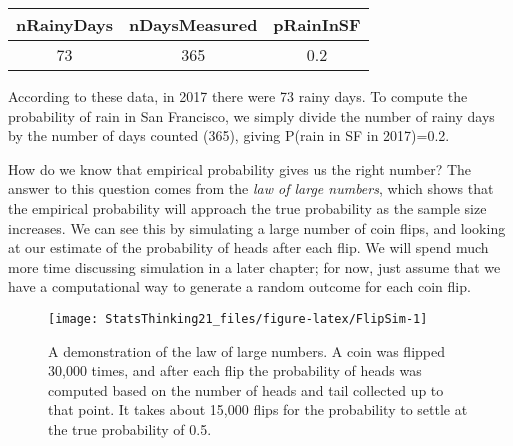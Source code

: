 \documentclass[]{book}
\theoremstyle{definition}
\theoremstyle{definition}
\theoremstyle{definition}
\theoremstyle{remark}
\begin{document}
\begin{longtable}[]{@{}ccc@{}}
\toprule
\begin{minipage}[b]{0.16\columnwidth}\centering\strut
nRainyDays\strut
\end{minipage} & \begin{minipage}[b]{0.20\columnwidth}\centering\strut
nDaysMeasured\strut
\end{minipage} & \begin{minipage}[b]{0.14\columnwidth}\centering\strut
pRainInSF\strut
\end{minipage}\tabularnewline
\midrule
\endhead
\begin{minipage}[t]{0.16\columnwidth}\centering\strut
73\strut
\end{minipage} & \begin{minipage}[t]{0.20\columnwidth}\centering\strut
365\strut
\end{minipage} & \begin{minipage}[t]{0.14\columnwidth}\centering\strut
0.2\strut
\end{minipage}\tabularnewline
\bottomrule
\end{longtable}

According to these data, in 2017 there were 73 rainy days. To compute
the probability of rain in San Francisco, we simply divide the number of
rainy days by the number of days counted (365), giving P(rain in SF in
2017)=0.2.

How do we know that empirical probability gives us the right number? The
answer to this question comes from the \emph{law of large numbers},
which shows that the empirical probability will approach the true
probability as the sample size increases. We can see this by simulating
a large number of coin flips, and looking at our estimate of the
probability of heads after each flip. We will spend much more time
discussing simulation in a later chapter; for now, just assume that we
have a computational way to generate a random outcome for each coin
flip.

\begin{figure}
\texttt{[image: StatsThinking21\_files/figure-latex/FlipSim-1]} \caption{A demonstration of the law of large numbers.  A coin was flipped 30,000 times, and after each flip the probability of heads was computed based on the number of heads and tail collected up to that point.  It takes about 15,000 flips for the probability to settle at the true probability of 0.5.}\label{fig:FlipSim}
\end{figure}
\end{document}
